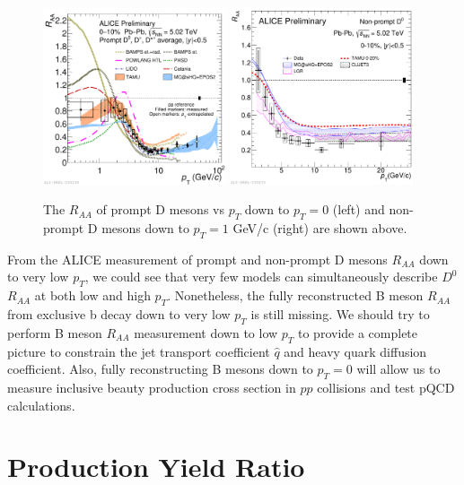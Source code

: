 \begin{figure}[hbtp]
\begin{center}
\includegraphics[width=0.48\textwidth]{Figures/Chapter2/ALICEDRAALow.pdf}
\includegraphics[width=0.48\textwidth]{Figures/Chapter2/ALICENPDRAALow.pdf}
\caption{The $R_{AA}$ of prompt D mesons vs $p_T$ down to $p_T = 0$ (left) and non-prompt D mesons down to $p_T = 1$ GeV/c (right) are shown above.}
\label{ALICEDRAALow}
\end{center}
\end{figure}   

From the ALICE measurement of prompt and non-prompt D mesons $R_{AA}$ down to very low $p_T$, we could see that very few models can simultaneously describe $D^0$ $R_{AA}$ at both low and high $p_T$. Nonetheless, the fully reconstructed B meson $R_{AA}$ from exclusive b decay down to very low $p_T$ is still missing. We should try to perform B meson $R_{AA}$ measurement down to low $p_T$ to provide a complete picture to constrain the jet transport coefficient $\hat q$ and heavy quark diffusion coefficient. Also, fully reconstructing B mesons down to $p_T = $0 will allow us to measure inclusive beauty production cross section in $pp$ collisions and test pQCD calculations.  


\section{Production Yield Ratio}

